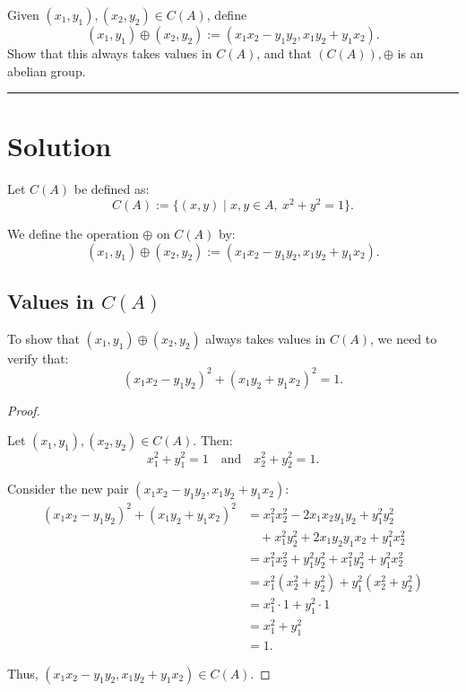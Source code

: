 \documentclass[12pt]{amsart}
\theoremstyle{definition}
\numberwithin{equation}{section}
\begin{document}
\begin{exercise}{4} Given \((x_1,y_1),(x_2,y_2) \in C(A)\), define \[(x_1,y_1) \oplus (x_2,y_2) := (x_1x_2 - y_1y_2, x_1y_2+y_1x_2). \] Show that this always takes values in \(C(A)\), and that \((C(A)), \oplus\) is an abelian group.
    
    \noindent\rule{\linewidth}{1pt}
    
    \section*{Solution}

    Let \(C(A)\) be defined as:
    \[
    C(A) := \{(x, y) \mid x, y \in A, \ x^2 + y^2 = 1\}.
    \]
    
    We define the operation \(\oplus\) on \(C(A)\) by:
    \[
    (x_1, y_1) \oplus (x_2, y_2) := (x_1 x_2 - y_1 y_2, x_1 y_2 + y_1 x_2).
    \]
    
    \subsection*{Values in \(C(A)\)}
    
    To show that \((x_1, y_1) \oplus (x_2, y_2)\) always takes values in \(C(A)\), we need to verify that:
    \[
    (x_1 x_2 - y_1 y_2)^2 + (x_1 y_2 + y_1 x_2)^2 = 1.
    \]
    
    \begin{proof} \( \)
    
    Let \((x_1, y_1), (x_2, y_2) \in C(A)\). Then:
    \[
    x_1^2 + y_1^2 = 1 \quad \text{and} \quad x_2^2 + y_2^2 = 1.
    \]
    
    Consider the new pair \((x_1 x_2 - y_1 y_2, x_1 y_2 + y_1 x_2)\):
    \[
    \begin{aligned}
    (x_1 x_2 - y_1 y_2)^2 + (x_1 y_2 + y_1 x_2)^2 &= x_1^2 x_2^2 - 2 x_1 x_2 y_1 y_2 + y_1^2 y_2^2 \\
    &\quad + x_1^2 y_2^2 + 2 x_1 y_2 y_1 x_2 + y_1^2 x_2^2 \\
    &= x_1^2 x_2^2 + y_1^2 y_2^2 + x_1^2 y_2^2 + y_1^2 x_2^2 \\
    &= x_1^2 (x_2^2 + y_2^2) + y_1^2 (x_2^2 + y_2^2) \\
    &= x_1^2 \cdot 1 + y_1^2 \cdot 1 \\
    &= x_1^2 + y_1^2 \\
    &= 1.
    \end{aligned}
    \]
    
    Thus, \((x_1 x_2 - y_1 y_2, x_1 y_2 + y_1 x_2) \in C(A)\).
    

\end{proof}
\end{exercise}
\end{document}
